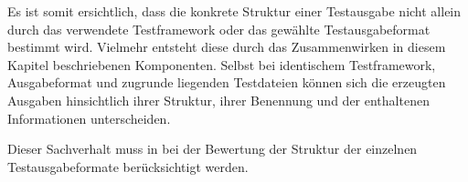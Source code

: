 Es ist somit ersichtlich, dass die konkrete Struktur einer Testausgabe nicht allein durch das verwendete Testframework oder das gewählte Testausgabeformat bestimmt wird. Vielmehr entsteht diese durch das Zusammenwirken in diesem Kapitel beschriebenen Komponenten. Selbst bei identischem Testframework, Ausgabeformat und zugrunde liegenden Testdateien können sich die erzeugten Ausgaben hinsichtlich ihrer Struktur, ihrer Benennung und der enthaltenen Informationen unterscheiden.

Dieser Sachverhalt muss in  bei der Bewertung der Struktur der einzelnen Testausgabeformate berücksichtigt werden. 
